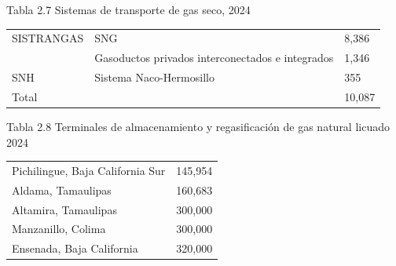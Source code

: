 \documentclass{sener2025}
\begin{document}
\begin{tabladoradoCorto}
  \caption{Tabla 2.7 Sistemas de transporte de gas seco, 2024}
  \label{tab:tabla_2_7_sistemas_de_transpor}
  \begin{tabularx}{\textwidth}{Vvv}
    \toprule
      &  &  \\
    \midrule
    SISTRANGAS & SNG & 8,386 \\
     & Gasoductos privados interconectados e integrados & 1,346 \\
    SNH & Sistema Naco-Hermosillo & 355 \\
    Total &  & 10,087 \\
    \bottomrule
  \end{tabularx}
\end{tabladoradoCorto}
\vspace{-4pt}

\begin{tabladoradoCorto}
  \caption{Tabla 2.8 Terminales de almacenamiento y regasificación de gas natural licuado 2024}
  \label{tab:tabla_2_8_terminales_de_almace}
  \begin{tabularx}{\textwidth}{Vv}
    \toprule
      &  \\
    \midrule
    Pichilingue, Baja California Sur & 145,954 \\
    Aldama, Tamaulipas & 160,683 \\
    Altamira, Tamaulipas & 300,000 \\
    Manzanillo, Colima & 300,000 \\
    Ensenada, Baja California & 320,000 \\
    \bottomrule
  \end{tabularx}
\end{tabladoradoCorto}
\vspace{-4pt}
\end{document}
